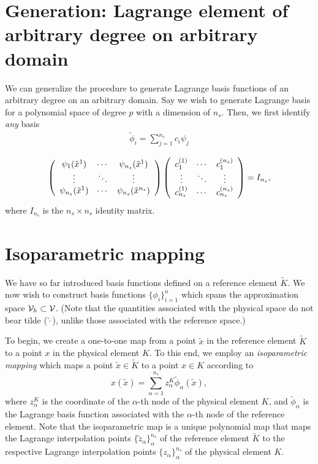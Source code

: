 \section{Generation: Lagrange element of arbitrary degree on arbitrary domain}
We can generalize the procedure to generate Lagrange basis functions of an arbitrary degree on an arbitrary domain.  Say we wish to generate Lagrange basis for a polynomial space of degree $p$ with a dimension of $n_s$.  Then, we first identify \emph{any} basis 
\begin{align*}
  \tilde \phi_i = \sum_{j=1}^{n_s} c_i \psi_j
\end{align*}

\begin{align*}
  \bmat{ccc}
  \psi_1(\tilde x^1) & \cdots & \psi_{n_s}(\tilde x^1) \\
  \vdots & \ddots & \vdots \\
  \psi_{n_s}(\tilde x^1) & \cdots & \psi_{n_s}(\tilde x^{n_s}) 
  \emat
  \bmat{ccc}
  c^{(1)}_1 & \cdots & c^{(n_s)}_1 \\
  \vdots & \ddots & \vdots \\
  c^{(1)}_{n_s} & \cdots & c^{(n_s)}_{n_s}
  \emat
  =
  I_{n_s},
\end{align*}
where $I_{n_s}$ is the $n_s \times n_s$ identity matrix.



\section{Isoparametric mapping}
We have so far introduced basis functions defined on a reference element $\tilde K$. We now wish to construct basis functions $\{\phi_i\}_{i=1}^n$ which spans the approximation space $\calV_h \subset \calV$.  (Note that the quantities associated with the physical space do not bear tilde ($\tilde \cdot$), unlike those associated with the reference space.)

To begin, we create a one-to-one map from a point $\tilde x$ in the reference element $\tilde K$ to a point $x$ in the physical element $K$.  To this end, we employ an \emph{isoparametric mapping} which maps a point $\tilde x \in \tilde K$ to a point $x \in K$ according to
\begin{equation}
  x(\tilde x) = \sum_{\alpha=1}^{n_s} z^K_\alpha \tilde \phi_\alpha(\tilde x) ,
  \label{eq:fe_iso_map}
\end{equation}
where $z^K_\alpha$ is the coordinate of the $\alpha$-th node of the physical element $K$, and $\tilde \phi_\alpha$ is the Lagrange basis function associated with the $\alpha$-th node of the reference element.  Note that the isoparametric map is a unique polynomial map that maps the Lagrange interpolation points $\{ \tilde z_\alpha \}_{\alpha}^{n_s}$ of the reference element $\tilde K$ to the respective Lagrange interpolation points $\{ z_\alpha \}_{\alpha}^{n_s}$ of the physical element $K$.

